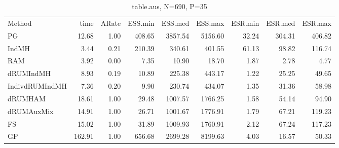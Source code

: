 \begin{table}
\begin{tabular}{l r r r r r r r r } 
          Method  &     time &    ARate &  ESS.min &  ESS.med &  ESS.max &  ESR.min &  ESR.med &  ESR.max \\ 
              PG  &    12.68 &     1.00 &   408.65 &  3857.54 &  5156.60 &    32.24 &   304.31 &   406.82 \\ 
           IndMH  &     3.44 &     0.21 &   210.39 &   340.61 &   401.55 &    61.13 &    98.82 &   116.74 \\ 
             RAM  &     3.92 &     0.00 &     7.35 &    10.90 &    18.70 &     1.87 &     2.78 &     4.77 \\ 
       dRUMIndMH  &     8.93 &     0.19 &    10.89 &   225.38 &   443.17 &     1.22 &    25.25 &    49.65 \\ 
  IndivdRUMIndMH  &     7.36 &     0.20 &     9.90 &   230.74 &   434.07 &     1.35 &    31.36 &    58.98 \\ 
         dRUMHAM  &    18.61 &     1.00 &    29.48 &  1007.57 &  1766.25 &     1.58 &    54.14 &    94.90 \\ 
      dRUMAuxMix  &    14.91 &     1.00 &    26.71 &  1001.67 &  1776.91 &     1.79 &    67.21 &   119.23 \\ 
              FS  &    15.02 &     1.00 &    31.89 &  1009.93 &  1760.91 &     2.12 &    67.24 &   117.23 \\ 
              GP  &   162.91 &     1.00 &   656.68 &  2699.28 &  8199.63 &     4.03 &    16.57 &    50.33
 \end{tabular}
\caption{table.aus, N=690, P=35}
\end{table}

